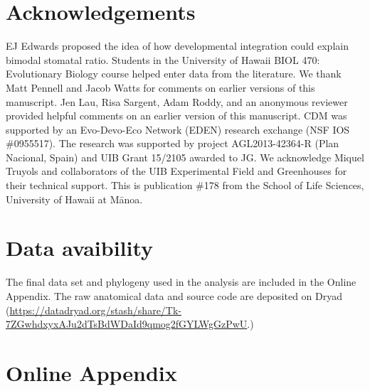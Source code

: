 \documentclass[
  12pt,
]{article}
\begin{document}
\hypertarget{acknowledgements}{%
\section{Acknowledgements}\label{acknowledgements}}

EJ Edwards proposed the idea of how developmental integration could explain bimodal stomatal ratio. Students in the University of Hawaii BIOL 470: Evolutionary Biology course helped enter data from the literature. We thank Matt Pennell and Jacob Watts for comments on earlier versions of this manuscript. Jen Lau, Risa Sargent, Adam Roddy, and an anonymous reviewer provided helpful comments on an earlier version of this manuscript. CDM was supported by an Evo-Devo-Eco Network (EDEN) research exchange (NSF IOS \#0955517). The research was supported by project AGL2013-42364-R (Plan Nacional, Spain) and UIB Grant 15/2105 awarded to JG. We acknowledge Miquel Truyols and collaborators of the UIB Experimental Field and Greenhouses for their technical support. This is publication \#178 from the School of Life Sciences, University of Hawaii at Mānoa.

\hypertarget{data-avaibility}{%
\section{Data avaibility}\label{data-avaibility}}

The final data set and phylogeny used in the analysis are included in the Online Appendix. The raw anatomical data and source code are deposited on Dryad (\url{https://datadryad.org/stash/share/Tk-7ZGwhdxyxAJu2dTsBdWDaId9qmog2fGYLWgGzPwU}.)

\clearpage

\hypertarget{online-appendix}{%
\section{Online Appendix}\label{online-appendix}}

\renewcommand\thefigure{A\arabic{figure}}    
\renewcommand\thetable{A\arabic{table}}    
\renewcommand\theequation{A\arabic{equation}}    
\setcounter{figure}{0}    
\setcounter{table}{0}    
\setcounter{equation}{0}
\end{document}
